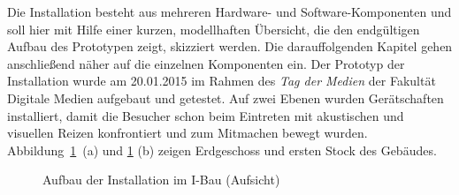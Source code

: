 
Die Installation besteht aus mehreren Hardware- und Software-Komponenten und soll hier mit Hilfe einer kurzen, modellhaften Übersicht, die den endgültigen Aufbau des Prototypen zeigt, skizziert werden. Die darauffolgenden Kapitel gehen anschließend näher auf die einzelnen Komponenten ein. Der Prototyp der Installation wurde am 20.01.2015 im Rahmen des \textit{Tag der Medien} der Fakultät Digitale Medien aufgebaut und getestet. Auf zwei Ebenen wurden Gerätschaften installiert, damit die Besucher schon beim Eintreten mit akustischen und visuellen Reizen konfrontiert und zum Mitmachen bewegt wurden. Abbildung~\ref{fig:Aufbau}~(a) und \ref{fig:Aufbau} (b) zeigen Erdgeschoss und ersten Stock des Gebäudes.

\begin{figure}[htbp]
\hfill
{}
\caption{Aufbau der Installation im I-Bau (Aufsicht)}
\label{fig:Aufbau}
\end{figure}

